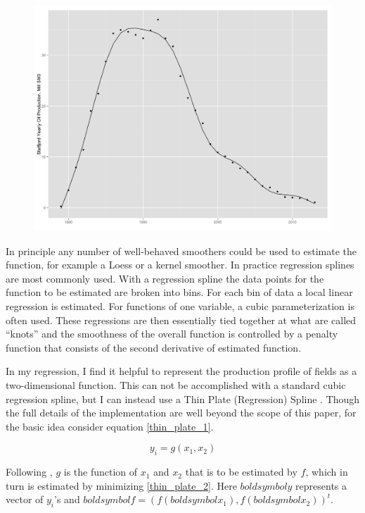 \documentclass[12pt]{scrartcl} %
\begin{document}
\begin{figure}
	\includegraphics[width=.8\textwidth]{statfjord_gam.png}
	\caption{}
	\label{statfjord_gam}
\end{figure}

In principle any number of well-behaved smoothers could be used to estimate the function, for example a Loess or a kernel smoother.  In practice regression splines are most commonly used.  With a regression spline the data points for the function to be estimated are broken into bins.  For each bin of data a local linear regression is estimated.  For functions of one variable, a cubic parameterization is often used.  These regressions are then essentially tied together at what are called “knots” and the smoothness of the overall function is controlled by a penalty function that consists of the second derivative of estimated function.

In my regression, I find it helpful to represent the production profile of fields as a two-dimensional function.  This can not be accomplished with a standard cubic regression spline, but I can instead use a Thin Plate (Regression) Spline \citet{wood_thin_2003}.  Though the full details of the implementation are well beyond the scope of this paper, for the basic idea consider equation \ref{thin_plate_1}.  

	\begin{equation}
	y_i = g(x_1, x_2)
	\label{thin_plate_1}
	\end{equation}

Following \citet{wood_generalized_2006}, $g$ is the function of $x_1$ and $x_2$ that is to be estimated by $f$, which in turn is estimated by minimizing \ref{thin_plate_2}.  Here $boldsymbol{y}$ represents a vector of $y_i$’s and $boldsymbol{f} = (f(boldsymbol{x_1}),f(boldsymbol{x_2}))^t$.   
\end{document}
